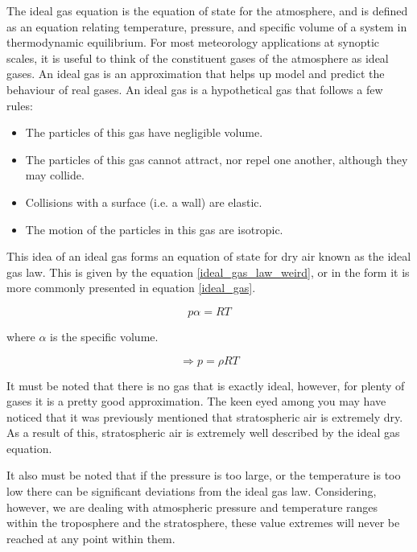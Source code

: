 The ideal gas equation is the equation of state for the atmosphere, and is defined as an equation relating temperature, pressure, and specific volume of a system in thermodynamic equilibrium\cite{state_equation}. For most meteorology applications at synoptic scales, it is useful to think of the constituent gases of the atmosphere as ideal gases\cite{ideal_gas}. An ideal gas is an approximation that helps up model and predict the behaviour of real gases. An ideal gas is a hypothetical gas that follows a few rules\cite{iop}: 

\begin{itemize}
    \item The particles of this gas have negligible volume.
    \item The particles of this gas cannot attract, nor repel one another, although they may collide.
    \item Collisions with a surface (i.e. a wall) are elastic.
    \item The motion of the particles in this gas are isotropic. 
\end{itemize}

This idea of an ideal gas forms an equation of state for dry air known as the ideal gas law. This is given by the equation \ref{ideal_gas_law_weird}, or in the form it is more commonly presented in equation \ref{ideal_gas}.

\begin{equation}
    \label{ideal_gas_law_weird}
    p\alpha = RT
\end{equation}

where $\alpha$ is the specific volume.

\begin{equation}
    \label{ideal_gas}
    \Rightarrow p = \rho RT
\end{equation}

It must be noted that there is no gas that is exactly ideal, however, for plenty of gases it is a pretty good approximation. The keen eyed among you may have noticed that it was previously mentioned that stratospheric air is extremely dry. As a result of this, stratospheric air is extremely well described by the ideal gas equation. 

It also must be noted that if the pressure is too large, or the temperature is too low there can be significant deviations from the ideal gas law\cite{ideal_gas}. Considering, however, we are dealing with atmospheric pressure and temperature ranges within the troposphere and the stratosphere, these value extremes will never be reached at any point within them.

